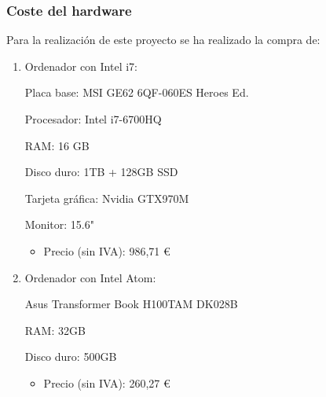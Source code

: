 \documentclass[12pt,a4paper,onecolumn,oneside]{report}
\begin{document}
\begin{table}[ht]
	\centering
	\caption{Presupuesto de personal}
	\label{tabla2}
\end{table}


\subsubsection{Coste del hardware}

Para la realización de este proyecto se ha realizado la compra de:

\begin{enumerate}
	
	\item Ordenador con Intel i7:
	
	Placa base: MSI GE62 6QF-060ES Heroes Ed.
	
	Procesador: Intel i7-6700HQ
	
	RAM: 16 GB
	
	Disco duro: 1TB + 128GB SSD
	
	Tarjeta gráfica: Nvidia GTX970M
	
	Monitor: 15.6"
	
	\begin{itemize}
		\item Precio (sin IVA): 986,71 \euro\\
	\end{itemize}
	
	\item Ordenador con Intel Atom:
	
	Asus Transformer Book H100TAM DK028B
	
	RAM: 32GB
	
	Disco duro: 500GB
	
	\begin{itemize}
		\item Precio (sin IVA): 260,27 \euro
	\end{itemize}
	
\end{enumerate}
\end{document}
